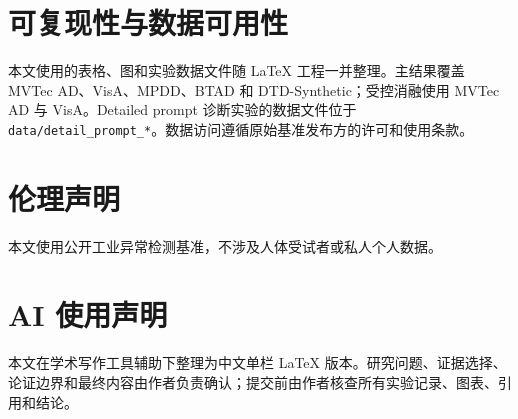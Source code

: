 \section*{可复现性与数据可用性}

本文使用的表格、图和实验数据文件随 LaTeX 工程一并整理。主结果覆盖 MVTec AD、VisA、MPDD、BTAD 和 DTD-Synthetic；受控消融使用 MVTec AD 与 VisA。Detailed prompt 诊断实验的数据文件位于 \texttt{data/detail\_prompt\_*}。数据访问遵循原始基准发布方的许可和使用条款。

\section*{伦理声明}

本文使用公开工业异常检测基准，不涉及人体受试者或私人个人数据。

\section*{AI 使用声明}

本文在学术写作工具辅助下整理为中文单栏 LaTeX 版本。研究问题、证据选择、论证边界和最终内容由作者负责确认；提交前由作者核查所有实验记录、图表、引用和结论。
